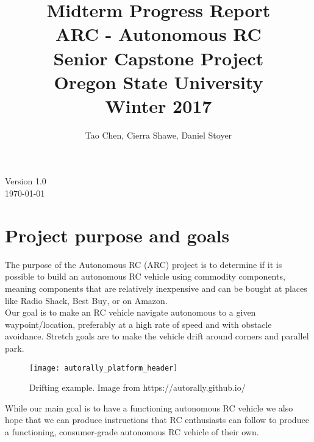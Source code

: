 \documentclass[compsoc,draftclsnofoot,onecolumn,10pt]{IEEEtran}
\date{}
\begin{document}
\begin{titlepage}
\title{
Midterm Progress Report\\
\LARGE
ARC - Autonomous RC\\
Senior Capstone Project\\
Oregon State University\\
Winter 2017
}
\author{Tao Chen, Cierra Shawe, Daniel Stoyer}
\maketitle
\begin{center}
	Version 1.0\\
	\today
\end{center}

\thispagestyle{empty} %
	
\end{titlepage}

\tableofcontents

\newpage

\section{Project purpose and goals} 
The purpose of the Autonomous RC (ARC) project is to determine if it is possible
to build an autonomous RC vehicle using commodity components, meaning components
that are relatively inexpensive and can be bought at places like Radio
Shack\textsuperscript{\textregistered}, Best Buy\textsuperscript{\textregistered}, or on Amazon. \\
Our goal is to make an RC vehicle navigate autonomous to a given
waypoint/location, preferably at a high rate of speed and with obstacle avoidance. Stretch goals are to
make the vehicle drift around corners and parallel park.\\

\begin{figure}[H]
   	\texttt{[image: autorally\_platform\_header]}
    \caption{Drifting example. Image from https://autorally.github.io/}
\end{figure}

While our main goal is to have a functioning autonomous RC vehicle we also hope
that we can produce instructions that RC enthusiasts can follow to produce a
functioning, consumer-grade autonomous RC vehicle of their own.
\end{document}
